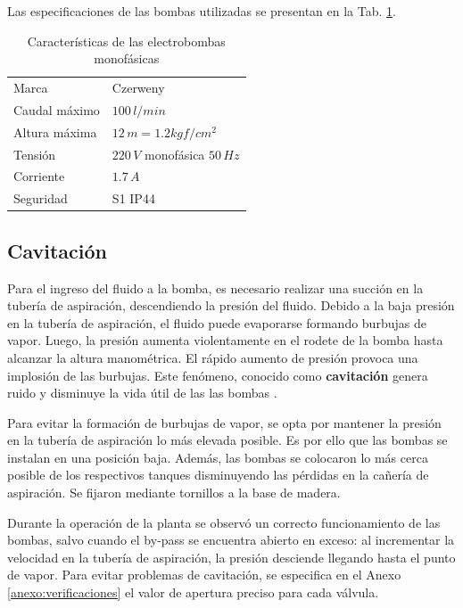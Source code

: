 Las especificaciones de las bombas utilizadas se presentan en la Tab.
\ref{tab:caractBombas}.

\begin{table}[ht]
\renewcommand{\arraystretch}{1.3}
\centering
\begin{tabular}{|l|l|}
\hline
Marca & Czerweny\\
Caudal máximo &  $100\,l/min$\\
Altura máxima &  $12\,m = 1.2 kgf/cm^2$\\
Tensión & $220\,V$ monofásica $50\,Hz$\\
Corriente & $1.7\,A$\\
Seguridad & S1 IP44\\
\hline
\end{tabular}
\caption{Características de las electrobombas monofásicas}
\label{tab:caractBombas}
\end{table}

\subsection{Cavitación}
\label{subsec:cavitacion}
Para el ingreso del fluido a la bomba, es necesario realizar una succión
en la tubería de aspiración, descendiendo la presión del fluido.
Debido a la baja presión en la tubería de aspiración, el fluido puede
evaporarse formando burbujas de vapor.
Luego, la presión aumenta violentamente en el rodete de la bomba hasta alcanzar
la altura manométrica.
El rápido aumento de presión provoca una implosión de las burbujas.
Este fenómeno, conocido como \textbf{cavitación} genera ruido y disminuye la
vida útil de las las bombas \cite{bib:ApuntesMDFBombas}.

Para evitar la formación de burbujas de vapor, se opta por mantener la presión
en la tubería de aspiración lo más elevada posible.
Es por ello que las bombas se instalan en una posición baja.
Además, las bombas se colocaron lo más cerca posible de los respectivos
tanques disminuyendo las pérdidas en la cañería de aspiración.
Se fijaron mediante tornillos a la base de madera.

Durante la operación de la planta se observó un correcto funcionamiento de las
bombas, salvo cuando el by-pass se encuentra abierto en exceso: al
incrementar la
velocidad en la tubería de aspiración, la presión desciende llegando hasta el
punto de vapor.
Para evitar problemas de cavitación, se especifica en el Anexo
\ref{anexo:verificaciones} el valor de apertura preciso para cada válvula.

